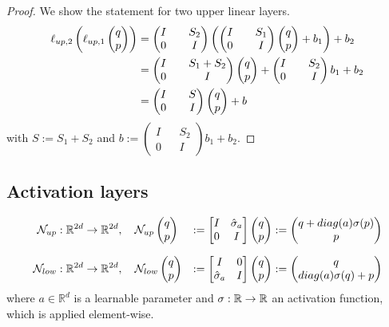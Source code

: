 \documentclass[twoside,a4paper]{article}
\begin{document}
\begin{proof}
	We show the statement for two upper linear layers.
	\begin{align*}
		\ell_{up,2}\left(\ell_{up,1} \begin{pmatrix} q \\ p \end{pmatrix}\right) &=
		\begin{pmatrix}
			I && S_2 \\
			0 && I
		\end{pmatrix}
		\left(
		\begin{pmatrix}
			I && S_1 \\
			0 && I
		\end{pmatrix}
		\begin{pmatrix} q \\ p \end{pmatrix} + b_1
		\right) + b_2 \\
		&= \begin{pmatrix}
			I && S_1 + S_2 \\
			0 && I
		\end{pmatrix} \begin{pmatrix} q \\ p \end{pmatrix}
		+ \begin{pmatrix}
			I && S_2 \\
			0 && I
		\end{pmatrix} b_1
		+ b_2 \\
		&= \begin{pmatrix}
			I && S \\
			0 && I
		\end{pmatrix} \begin{pmatrix} q \\ p \end{pmatrix} + b
	\end{align*}
	with $S := S_1 + S_2$ and $b := \begin{pmatrix}
		I && S_2 \\
		0 && I
	\end{pmatrix} b_1
	+ b_2$.
\end{proof}

\subsection{Activation layers}

\begin{alignat*}{2}
	\mathcal{N}_{up} &: \mathbb{R}^{2d} \to \mathbb{R}^{2d},
	\quad \mathcal{N}_{up} \begin{pmatrix} q \\ p \end{pmatrix} &:= \begin{bmatrix} I & {\hat{\sigma}_a} \\ 0 & I \end{bmatrix} \begin{pmatrix} q \\ p \end{pmatrix}
	:= \begin{pmatrix}
		q + diag(a)\sigma(p) \\
		p
	\end{pmatrix} \\[7pt]
	\mathcal{N}_{low} &: \mathbb{R}^{2d} \to \mathbb{R}^{2d},
	\quad \mathcal{N}_{low} \begin{pmatrix} q \\ p \end{pmatrix} &:= \begin{bmatrix} I & 0 \\ {\hat{\sigma}_a} & I \end{bmatrix} \begin{pmatrix} q \\ p \end{pmatrix}
	:= \begin{pmatrix}
		q \\
		diag(a)\sigma(q) + p
	\end{pmatrix}
\end{alignat*}
where $a \in \mathbb{R}^d$ is a learnable parameter and 
$\sigma : \mathbb{R} \to \mathbb{R}$ an activation function,
which is applied element-wise.
\end{document}
